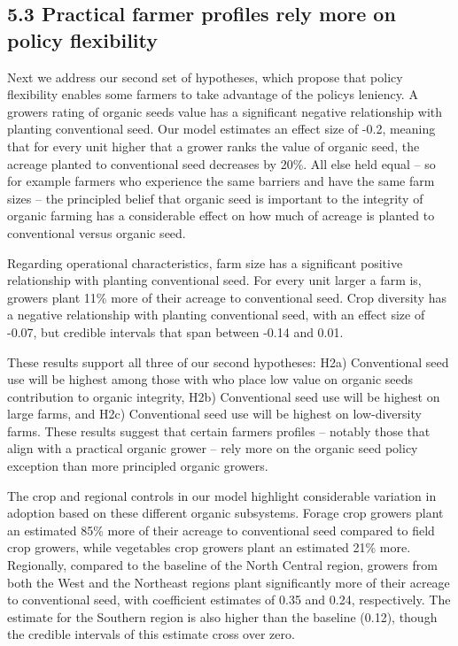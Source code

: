 \documentclass[twoside,12pt,final]{ucthesis-CA2012}
\begin{document}
\begin{ucmainmatter}
\hypertarget{practical-farmer-profiles-rely-more-on-policy-flexibility}{%
\subsection{5.3 \textquotesingle Practical\textquotesingle{} farmer profiles rely more on policy flexibility}\label{practical-farmer-profiles-rely-more-on-policy-flexibility}}

Next we address our second set of hypotheses, which propose that policy
flexibility enables some farmers to take advantage of the policy\textquotesingle s
leniency. A grower\textquotesingle s rating of organic seed\textquotesingle s value has a significant
negative relationship with planting conventional seed. Our model
estimates an effect size of -0.2, meaning that for every unit higher
that a grower ranks the value of organic seed, the acreage planted to
conventional seed decreases by 20\%. All else held equal -- so for
example farmers who experience the same barriers and have the same farm
sizes -- the principled belief that organic seed is important to the
integrity of organic farming has a considerable effect on how much of
acreage is planted to conventional versus organic seed.

Regarding operational characteristics, farm size has a significant
positive relationship with planting conventional seed. For every unit
larger a farm is, growers plant 11\% more of their acreage to
conventional seed. Crop diversity has a negative relationship with
planting conventional seed, with an effect size of -0.07, but credible
intervals that span between -0.14 and 0.01.

These results support all three of our second hypotheses: H2a)
Conventional seed use will be highest among those with who place low
value on organic seeds\textquotesingle{} contribution to organic integrity, H2b)
Conventional seed use will be highest on large farms, and H2c)
Conventional seed use will be highest on low-diversity farms. These
results suggest that certain farmers\textquotesingle{} profiles -- notably those that
align with a \textquotesingle practical\textquotesingle{} organic grower -- rely more on the organic
seed policy exception than more \textquotesingle principled\textquotesingle{} organic growers.

The crop and regional controls in our model highlight considerable
variation in adoption based on these different organic subsystems.
Forage crop growers plant an estimated 85\% more of their acreage to
conventional seed compared to field crop growers, while vegetables crop
growers plant an estimated 21\% more. Regionally, compared to the
baseline of the North Central region, growers from both the West and the
Northeast regions plant significantly more of their acreage to
conventional seed, with coefficient estimates of 0.35 and 0.24,
respectively. The estimate for the Southern region is also higher than
the baseline (0.12), though the credible intervals of this estimate
cross over zero.


\end{ucmainmatter}
\end{document}
